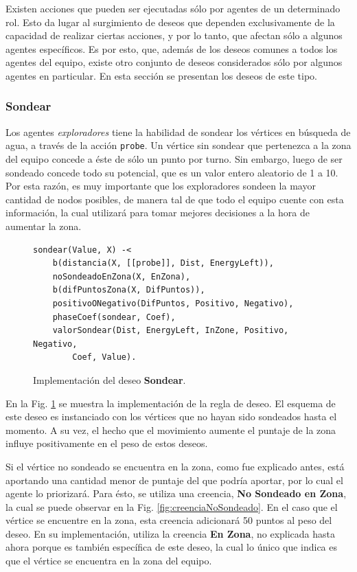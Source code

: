\documentclass[oneside]{book}
\theoremstyle{definition}
\begin{document}
Existen acciones que pueden ser ejecutadas sólo por agentes de un determinado rol. Esto da 
lugar al surgimiento de deseos que dependen exclusivamente de la capacidad de realizar 
ciertas acciones, y por lo tanto, que afectan sólo a algunos agentes específicos. Es por esto, 
que, además de los deseos comunes a todos los agentes del equipo, existe otro conjunto de 
deseos considerados sólo por algunos agentes en particular. En esta sección se presentan 
los deseos de este tipo.


\subsubsection{Sondear}

Los agentes \textit{exploradores} tiene la habilidad de sondear los vértices en 
búsqueda de agua, a través de la acción \texttt{probe}. Un vértice sin sondear 
que pertenezca a la zona del equipo concede a éste de sólo un punto por turno. 
Sin embargo, luego de ser sondeado concede todo su potencial, que es un valor 
entero aleatorio de 1 a 10. Por esta razón, es muy importante que los 
exploradores sondeen la mayor cantidad de nodos posibles, de manera tal de que 
todo el equipo cuente con esta información, la cual utilizará para tomar 
mejores decisiones a la hora de aumentar la zona.

\begin{figure}
\begin{verbatim}
sondear(Value, X) -< 
    b(distancia(X, [[probe]], Dist, EnergyLeft)),
    noSondeadoEnZona(X, EnZona),
    b(difPuntosZona(X, DifPuntos)),
    positivoONegativo(DifPuntos, Positivo, Negativo),
    phaseCoef(sondear, Coef),
    valorSondear(Dist, EnergyLeft, InZone, Positivo, Negativo, 
    	Coef, Value).
\end{verbatim}
\caption{Implementación del deseo \textbf{Sondear}.}
\label{fig:deseoSondear}
\end{figure}

En la Fig. \ref{fig:deseoSondear} se muestra la implementación de la regla de 
deseo. El esquema de este deseo es instanciado con los vértices que no hayan 
sido sondeados hasta el momento. A su vez, el hecho que el movimiento aumente
el puntaje de la zona influye positivamente en el peso de estos deseos.

Si el vértice no sondeado se encuentra en la zona, como fue explicado antes,
está aportando una cantidad menor de puntaje del que podría aportar, por lo 
cual el agente lo priorizará. Para ésto, se utiliza una creencia,
\textbf{No Sondeado en Zona}, la cual se puede observar en la Fig. 
\ref{fig:creenciaNoSondeado}. En el caso que el vértice se encuentre en la 
zona, esta creencia adicionará 50 puntos al peso del deseo. En su 
implementación, utiliza la creencia \textbf{En Zona}, no explicada hasta
ahora porque es también específica de este deseo, la cual lo único que 
indica es que el vértice se encuentra en la zona del equipo.
\end{document}
